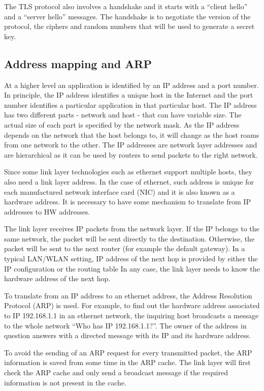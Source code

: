 The TLS protocol also involves a handshake and it starts with a ``client hello'' and a ``server hello'' messages.
The handshake is to negotiate the version of the protocol, the ciphers and random numbers that will be used to generate a secret key.

\subsection{Address mapping and ARP}

At a higher level an application is identified by an IP address and a port number. 
In principle, the IP address identifies a unique host in the Internet and the port number identifies a particular application in that particular host.
The IP address has two different parts - network and host -  that can have variable size.
The actual size of each part is specified by the network mask.
As the IP address depends on the network that the host belongs to, it will change as the host roams from one network to the other.
The IP addresses are network layer addresses and are hierarchical as it can be used by routers to send packets to the right network.

Since some link layer technologies such as ethernet support multiple hosts, they also need a link layer address.
In the case of ethernet, such address is unique for each manufactured network interface card (NIC) and it is also known as a hardware address.
It is necessary to have some mechanism to translate from IP addresses to HW addresses.

The link layer receives IP packets from the network layer.
If the IP belongs to the same network, the packet will be sent directly to the destination.
Otherwise, the packet will be sent to the next router (for example the default gateway).
In a typical LAN/WLAN setting,  IP address of the next hop is provided by either the IP configuration or the routing table
In any case, the link layer needs to know the hardware address of the next hop.

To translate from an IP address to an ethernet address, the Address Resolution Protocol (ARP) is used.
For example, to find out the hardware address associated to IP 192.168.1.1 in an ethernet network, the inquiring host broadcasts a message to the whole network ``Who has IP 192.168.1.1?''.
The owner of the address in question answers with a directed message with its IP and its hardware address.

To avoid the sending of an ARP request for every transmitted packet, the ARP information is saved from some time in the ARP cache.
The link layer will first check the ARP cache and only send a broadcast message if the required information is not present in the cache.


